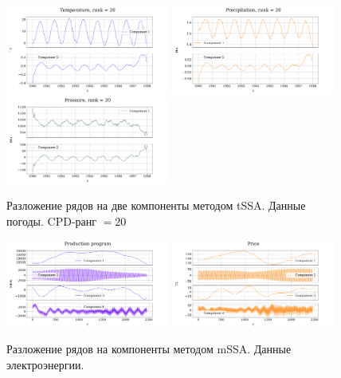 	\begin{figure}[h!]
		\centering
		\includegraphics[width=0.48\textwidth, keepaspectratio]{../../experiments/weather/tssa/figs/decomposition/cpd_rank_20/Temperature.png}
		\includegraphics[width=0.48\textwidth, keepaspectratio]{../../experiments/weather/tssa/figs/decomposition/cpd_rank_20/Precipitation.png}
		\includegraphics[width=0.48\textwidth, keepaspectratio]{../../experiments/weather/tssa/figs/decomposition/cpd_rank_20/Pressure.png}
		\caption{Разложение рядов на две компоненты методом tSSA. Данные погоды. CPD-ранг $ = 20 $}\label{fig:weather_decomp_tssa}
	\end{figure}
	
	
	\begin{figure}[h!]
		\centering
		\includegraphics[width=0.48\textwidth, keepaspectratio]{../../experiments/electricity/mssa/figs/decomposition/manual/grouping_1/Production_program.png}
		\includegraphics[width=0.48\textwidth, keepaspectratio]{../../experiments/electricity/mssa/figs/decomposition/manual/grouping_1/Price.png}
		\caption{Разложение рядов на компоненты методом mSSA. Данные электроэнергии.}\label{fig:electr_decomp_mssa}
	\end{figure}
	
